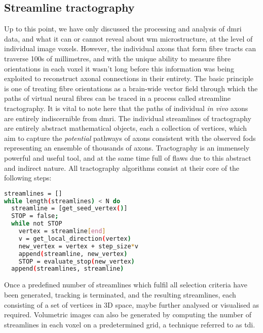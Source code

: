 \subsection{Streamline tractography}\label{sec:tractography}


Up to this point, we have only discussed the processing and analysis of \gls{dmri} data, and what it can or cannot reveal about \gls{wm} microstructure, at the level of individual image \glspl{voxel}.
However, the individual axons that form fibre tracts can traverse 100s of millimetres, and with the unique ability to measure fibre orientations in each voxel it wasn't long before this information was being exploited to reconstruct axonal connections in their entirety.
The basic principle is one of treating fibre orientations as a brain-wide vector field through which the paths of virtual neural fibres can be traced in a process called streamline tractography.
It is vital to note here that the paths of individual \textit{in vivo} axons are entirely indiscernible from \gls{dmri}.
The individual streamlines of tractography are entirely abstract mathematical objects, each a collection of vertices, which aim to capture the \textit{potential} pathways of axons consistent with the observed \glspl{fod} representing an ensemble of thousands of axons.
Tractography is an immensely powerful and useful tool, and at the same time full of flaws due to this abstract and indirect nature.
All tractography algorithms consist at their core of the following steps:

\begin{lstlisting}[language=bash,label={lst:track},frame=single]
streamlines = []
while length(streamlines) < N do
  streamline = [get_seed_vertex()]
  STOP = false;
  while not STOP
    vertex = streamline[end]
    v = get_local_direction(vertex)
    new_vertex = vertex + step_size*v
    append(streamline, new_vertex)
    STOP = evaluate_stop(new_vertex)
  append(streamlines, streamline)
\end{lstlisting}

Once a predefined number of streamlines which fulfil all selection criteria have been generated, tracking is terminated, and the resulting streamlines, each consisting of a set of vertices in 3D space, maybe further analysed or visualised as required.
Volumetric images can also be generated by computing the number of streamlines in each voxel on a predetermined grid, a technique referred to as \gls{tdi}\autocite{Calamante2010}.

